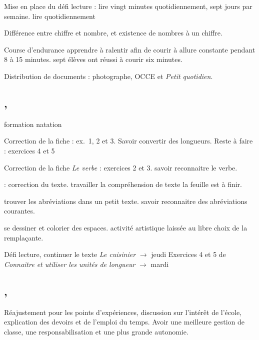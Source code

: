 \documentclass{article}
\begin{document}
	\dIs\cfr{} Mise en place du défi lecture : lire vingt minutes quotidiennement, sept jours par semaine.
	\obj lire quotidiennement
	
	\dIs\cge{}
	
	\dis\cma{} Différence entre chiffre et nombre, et existence de nombres à un chiffre.             
	
	\dIs\csp{} Course d’endurance
	\obj apprendre à ralentir afin de courir à allure constante pendant 8 à 15 minutes.
	\nte sept élèves ont réussi à courir six minutes.
	
	\dIs\cge{} Distribution de documents : photographe, OCCE et \emph{Petit quotidien}.
	
	
	\subsection{ \sep}
	\nte formation natation 
	
	\Dis\cma{} Correction de la fiche : ex.~1, 2 et 3.
	\obj Savoir convertir des longueurs.
	\bil Reste à faire : exercices 4 et 5
	
	\dIs\cfr{} Correction de la fiche \emph{Le verbe} : exercices 2 et 3.
	\obj savoir reconnaitre le verbe.
	
	\dIs\cfr{} : correction du texte.
	\obj travailler la compréhension de texte
	\bil la feuille est à finir.
	
	\dIs\cfr{} trouver les abréviations dans un petit texte.
	\obj savoir reconnaitre des abréviations courantes.
	
	\dIs\car{} se dessiner et colorier des espaces.
	\nte activité artistique laissée au libre choix de la remplaçante.
	
	\dev
	\sdl\bcb\cfr\lec Défi lecture, continuer le texte \textit{Le cuisinier} $\rightarrow$ jeudi
	\sdl\bcb\cma\gem Exercices 4 et 5 de \emph{Connaitre et utiliser les unités de longueur} $\rightarrow$ mardi
	
	
	\subsection{ \sep}
	\dIs\cge{} Réajustement pour les points d’expériences, discussion sur l’intérêt de l’école, explication des devoirs et de l’emploi du temps.
	\obj Avoir une meilleure gestion de classe, une responsabilisation et une plus grande autonomie.
	
\end{document}
